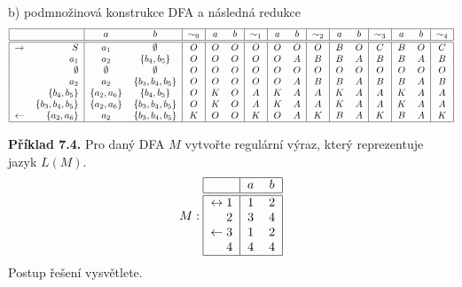 \documentclass[11pt]{article}
\begin{document}
b) podmnožinová konstrukce DFA a následná redukce
\[
\begin{tabular}{|r r|c c|c|c c|c|c c|c|c c|c|c c|c|}
    \hline
    & & $a$ & $b$ & $\sim_0$ & $a$ & $b$ & $\sim_1$ & $a$ & $b$ & $\sim_2$ & $a$ & $b$ & $\sim_3$ & $a$ & $b$ & $\sim_4$\\
    \hline
    \hline
    $\rightarrow$& $S$                &$a_1$         &$\emptyset$        & $O$ & $O$ & $O$ & $O$ & $O$ & $O$ & $O$ & $B$ & $O$ & $C$ & $B$ & $O$ & $C$\\
                 & $a_1$              &$a_2$         &$\{b_4, b_5\}$     & $O$ & $O$ & $O$ & $O$ & $O$ & $A$ & $B$ & $B$ & $A$ & $B$ & $B$ & $A$ & $B$\\
                 & $\emptyset$        &$\emptyset$   &$\emptyset$        & $O$ & $O$ & $O$ & $O$ & $O$ & $O$ & $O$ & $O$ & $O$ & $O$ & $O$ & $O$ & $O$\\
                 & $a_2$              &$a_2$         &$\{b_3, b_4, b_5\}$& $O$ & $O$ & $O$ & $O$ & $O$ & $A$ & $B$ & $B$ & $A$ & $B$ & $B$ & $A$ & $B$\\
                 & $\{b_4, b_5\}$     &$\{a_2, a_6\}$&$\{b_4, b_5\}$     & $O$ & $K$ & $O$ & $A$ & $K$ & $A$ & $A$ & $K$ & $A$ & $A$ & $K$ & $A$ & $A$\\
                 & $\{b_3, b_4, b_5\}$&$\{a_2, a_6\}$&$\{b_3, b_4, b_5\}$& $O$ & $K$ & $O$ & $A$ & $K$ & $A$ & $A$ & $K$ & $A$ & $A$ & $K$ & $A$ & $A$\\
   $\leftarrow$ & $\{a_2, a_6\}$     &$a_2$         &$\{b_3, b_4, b_5\}$& $K$ & $O$ & $O$ & $K$ & $O$ & $A$ & $K$ & $B$ & $A$ & $K$ & $B$ & $A$ & $K$\\ 
    \hline
\end{tabular}
\]


\pagebreak 
\textbf{Příklad 7.4.} Pro daný DFA $M$ vytvořte regulární výraz, který reprezentuje jazyk $L(M)$.
\[ M:
    \begin{tabular}{|r|c c|}
        \hline
        & $a$ & $b$\\
        \hline
        \hline
        $\leftrightarrow 1$ & $1$ & $2$\\
        $2$                 & $3$ & $4$\\
        $\leftarrow 3$      & $1$ & $2$\\
        $            4$     & $4$ & $4$\\
        \hline
    \end{tabular}
\]
Postup řešení vysvětlete.
\\
\end{document}
